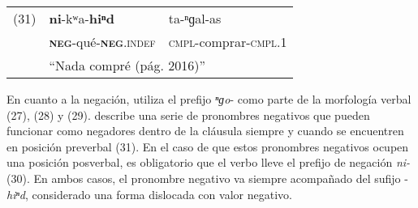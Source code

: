 {%
\begin{tabular}{lll}
(31) & \textbf{ni}-kʷa-\textbf{hiⁿd} & ta-ⁿɡal-as \\
& \textsc{\textbf{neg}}-qué-\textsc{\textbf{neg}.indef} & \textsc{cmpl}-comprar-\textsc{cmpl.1} \\
& \multicolumn{2}{l}{``Nada compré (pág. 2016)''} \\
\end{tabular} \vspace{0.5cm}

}

En cuanto a la negación, utiliza el prefijo {\setmainfont{Charis SIL} \textit{ⁿɡo}-} como parte de la morfología verbal (27), (28) y (29). \textcolor{MidnightBlue}{\citet{Huave}} describe una serie de pronombres negativos que pueden funcionar como negadores dentro de la cláusula siempre y cuando se encuentren en posición preverbal (31). En el caso de que estos pronombres negativos ocupen una posición posverbal, es obligatorio que el verbo lleve el prefijo de negación {\setmainfont{Charis SIL} \textit{ni-}} (30). En ambos casos, el pronombre negativo va siempre acompañado del sufijo {\setmainfont{Charis SIL} -\textit{hiⁿd}}, considerado una forma dislocada con valor negativo.